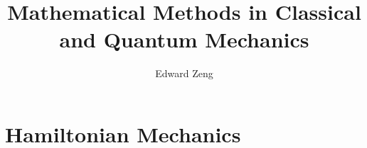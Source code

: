 
\title{Mathematical Methods in Classical and Quantum Mechanics}
\author{Edward Zeng}


    \maketitle
    \tableofcontents
    \newpage
    \pagestyle{fancy}
    \section{Hamiltonian Mechanics}
    
    


